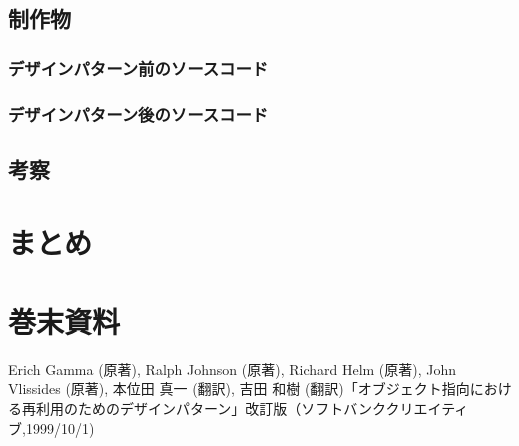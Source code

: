 \documentclass[dvipdfmx]{jsarticle}
\begin{document}
\subsection{制作物}
\subsubsection{デザインパターン前のソースコード}
\subsubsection{デザインパターン後のソースコード}
\subsection{考察}
\section{まとめ}
\section{巻末資料}
\begin{thebibliography}{99}
    Erich Gamma (原著), Ralph Johnson (原著), Richard Helm (原著), John Vlissides (原著), 本位田 真一 (翻訳), 吉田 和樹 (翻訳)「オブジェクト指向における再利用のためのデザインパターン」改訂版（ソフトバンククリエイティブ,1999/10/1)
\end{thebibliography}
\end{document}
